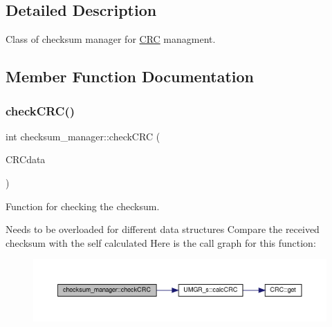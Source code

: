 \subsection{Detailed Description}
Class of checksum manager for \hyperlink{structCRC}{C\+RC} managment. 

\subsection{Member Function Documentation}
\mbox{\label{classchecksum__manager_a14eeba6bf4d2ad333c227339bd453a72}} 
\subsubsection{\texorpdfstring{check\+C\+R\+C()}{checkCRC()}\hspace{0.1cm}{\footnotesize\ttfamily [1/2]}}
{\footnotesize\ttfamily int checksum\+\_\+manager\+::check\+C\+RC (\begin{DoxyParamCaption}\item[{\hyperlink{structUMGR__s}{U\+M\+G\+R\+\_\+s} $\ast$}]{C\+R\+Cdata }\end{DoxyParamCaption})}



Function for checking the checksum. 

Needs to be overloaded for different data structures Compare the received checksum with the self calculated Here is the call graph for this function\+:
\nopagebreak
\begin{figure}[H]
\begin{center}
\leavevmode
\includegraphics[width=350pt]{classchecksum__manager_a14eeba6bf4d2ad333c227339bd453a72_cgraph}
\end{center}
\end{figure}
\mbox{\label{classchecksum__manager_a74f8d881aee7981cc60b2d169915bc4e}} 
